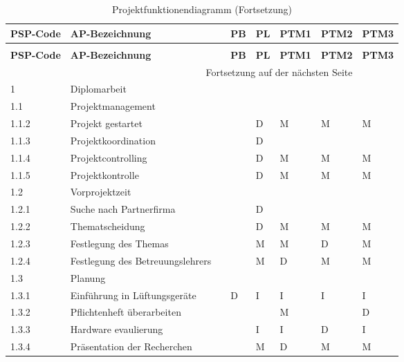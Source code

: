 \newpage
\begin{longtable}{p{} p{} p{} p{}  p{} p{} p{} p{}}
	\caption{Projektfunktionendiagramm}
	\label{tab:funktionendiagramm}
	\\ \toprule
	\textbf{PSP-Code} & \textbf{AP-Bezeichnung} & & \textbf{PB} & \textbf{PL} & \textbf{PTM1} & \textbf{PTM2} & \textbf{PTM3}
	\\ \midrule
	\endfirsthead
	\caption{Projektfunktionendiagramm (Fortsetzung)}
	\\ \toprule
	\textbf{PSP-Code} & \textbf{AP-Bezeichnung} & & \textbf{PB} & \textbf{PL} & \textbf{PTM1} & \textbf{PTM2} & \textbf{PTM3}
	\\ \midrule
	\endhead
	\midrule
	\multicolumn{7}{r}{{Fortsetzung auf  der nächsten Seite}} 
	\\ \bottomrule
	\endfoot
	\bottomrule
	\endlastfoot
	\rowcolor{mygray} 1 & Diplomarbeit & & & & & & \\ \midrule
	\rowcolor{mygray2}1.1 & Projektmanagement & & & & & &\\ \midrule
	1.1.2 & Projekt gestartet & & & D & M & M & M \\ \midrule
	1.1.3 & Projektkoordination & & & D & & & \\ \midrule
	1.1.4 & Projektcontrolling & & & D & M & M & M \\ \midrule
	1.1.5 & Projektkontrolle & & & D & M & M & M \\ \midrule
	\rowcolor{mygray2}1.2 & Vorprojektzeit & & & & & & \\ \midrule
	1.2.1 & Suche nach Partnerfirma & & & D & & & \\ \midrule
	1.2.2 & Thematscheidung & & & D & M & M & M \\ \midrule
	1.2.3 & Festlegung des Themas & & & M & M & D & M \\ \midrule
	1.2.4 & Festlegung des Betreuungslehrers & & & M & D & M & M \\ \midrule
	\rowcolor{mygray2}1.3 & Planung & & & & & & \\ \midrule
	1.3.1 & Einführung in Lüftungsgeräte & & D & I & I & I & I \\ \midrule
	1.3.2 & Pflichtenheft überarbeiten & & & & M & & D \\ \midrule
	1.3.3 & Hardware evaulierung & & & I & I & D & I \\
	1.3.4 & Präsentation der Recherchen & & & M & D & M & M \\ \midrule

\end{longtable}
